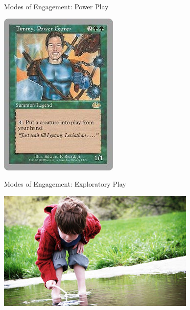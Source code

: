 \documentclass[xcolor=x11names]{beamer}
\begin{document}
\begin{frame}{Modes of Engagement: Power Play}
  \begin{center}
    \includegraphics[height=0.7\textheight]{res/timmy.jpg}
  \end{center}
\end{frame}

\begin{frame}{Modes of Engagement: Exploratory Play}
  \begin{center}
    \includegraphics[height=0.7\textheight]{res/exploratory-play.jpg}
  \end{center}
\end{frame}
\end{document}
